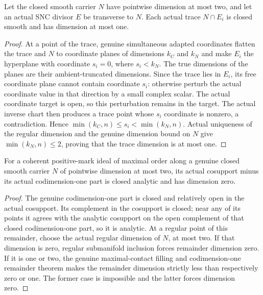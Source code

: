 \begin{lemma}
\label{hir:dimtwo-boundary-trace-dimension}
\leanok
Let the closed smooth carrier $N$ have pointwise dimension at most two,
and let an actual SNC divisor $E$ be transverse to $N$. Each actual trace
$N\cap E_i$ is closed smooth and has dimension at most one.
\end{lemma}
\begin{proof}
At a point of the trace, genuine simultaneous adapted coordinates flatten
the trace and $N$ to coordinate planes of dimensions $k_C$ and $k_N$ and
make $E_i$ the hyperplane with coordinate $s_i=0$, where $s_i<k_N$.
The true dimensions of the planes are their ambient-truncated dimensions.
Since the trace lies in $E_i$, its free coordinate plane cannot contain
coordinate $s_i$: otherwise perturb the actual coordinate value in that
direction by a small complex scalar. The actual coordinate target is open,
so this perturbation remains in the target. The actual inverse chart then
produces a trace point whose $s_i$ coordinate is nonzero, a contradiction.
Hence $\min(k_C,n)\le s_i<\min(k_N,n)$. Actual uniqueness of the regular
dimension and the genuine dimension bound on $N$ give
$\min(k_N,n)\le2$, proving that the trace dimension is at most one.
\end{proof}

\begin{lemma}
\label{hir:dimtwo-cosupport-codimtwo-remainder}
\leanok
For a coherent positive-mark ideal of maximal order along a genuine closed
smooth carrier $N$ of pointwise dimension at most two, its actual cosupport
minus its actual codimension-one part is closed analytic and has dimension zero.
\end{lemma}
\begin{proof}
The genuine codimension-one part is closed and relatively open in the
actual cosupport. Its complement in the cosupport is closed; near any of
its points it agrees with the analytic cosupport on the open complement
of that closed codimension-one part, so it is analytic. At a regular point
of this remainder, choose the actual regular dimension of $N$, at most two.
If that dimension is zero, regular submanifold inclusion forces remainder
dimension zero. If it is one or two, the genuine maximal-contact filling
and codimension-one remainder theorem makes the remainder dimension
strictly less than respectively zero or one. The former case is impossible
and the latter forces dimension zero.
\end{proof}

